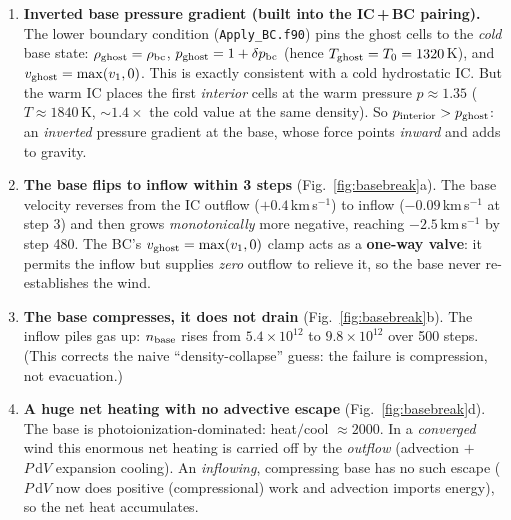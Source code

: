 \documentclass[english,a4paper]{my_memo}
\begin{document}
\begin{enumerate}\itemsep3pt
\item \textbf{Inverted base pressure gradient (built into the IC$\,$+$\,$BC pairing).} The
  lower boundary condition (\texttt{Apply\_BC.f90}) pins the ghost cells to the \emph{cold}
  base state: $\rho_{\rm ghost}=\rho_{\rm bc}$, $p_{\rm ghost}=1+\delta p_{\rm bc}$ (hence
  $T_{\rm ghost}=T_0=1320$\,K), and $v_{\rm ghost}=\max(v_1,0)$. This is exactly consistent
  with a cold hydrostatic IC. But the warm IC places the first \emph{interior} cells at the
  warm pressure $p\!\approx\!1.35$ ($T\!\approx\!1840$\,K, $\sim\!1.4\times$ the cold value at
  the same density). So $p_{\rm interior}>p_{\rm ghost}$: an \emph{inverted} pressure
  gradient at the base, whose force points \emph{inward} and adds to gravity.

\item \textbf{The base flips to inflow within 3 steps} (Fig.~\ref{fig:basebreak}a). The base
  velocity reverses from the IC outflow ($+0.4$\,km\,s$^{-1}$) to inflow
  ($-0.09$\,km\,s$^{-1}$ at step 3) and then grows \emph{monotonically} more negative,
  reaching $-2.5$\,km\,s$^{-1}$ by step 480. The BC's $v_{\rm ghost}=\max(v_1,0)$ clamp acts
  as a \textbf{one-way valve}: it permits the inflow but supplies \emph{zero} outflow to
  relieve it, so the base never re-establishes the wind.

\item \textbf{The base compresses, it does not drain} (Fig.~\ref{fig:basebreak}b). The inflow
  piles gas up: $n_{\rm base}$ rises from $5.4\times10^{12}$ to $9.8\times10^{12}$ over 500
  steps. (This corrects the naive ``density-collapse'' guess: the failure is compression,
  not evacuation.)

\item \textbf{A huge net heating with no advective escape} (Fig.~\ref{fig:basebreak}d). The
  base is photoionization-dominated: heat$/$cool $\approx 2000$. In a \emph{converged} wind
  this enormous net heating is carried off by the \emph{outflow} (advection $+$ $P\,\mathrm dV$
  expansion cooling). An \emph{inflowing}, compressing base has no such escape ($P\,\mathrm
  dV$ now does positive (compressional) work and advection imports energy), so the net heat
  accumulates.


\end{enumerate}
\end{document}
